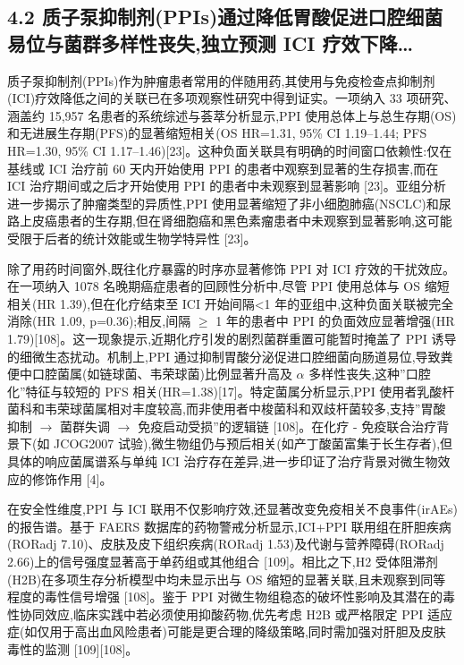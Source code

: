 \subsection{4.2 质子泵抑制剂(PPIs)通过降低胃酸促进口腔细菌易位与菌群多样性丧失,独立预测 ICI 疗效下降\ldots{}}\label{ux8d28ux5b50ux6cf5ux6291ux5236ux5242ppisux901aux8fc7ux964dux4f4eux80c3ux9178ux4fc3ux8fdbux53e3ux8154ux7ec6ux83ccux6613ux4f4dux4e0eux83ccux7fa4ux591aux6837ux6027ux4e27ux5931ux72ecux7acbux9884ux6d4b-ici-ux7597ux6548ux4e0bux964d}

质子泵抑制剂(PPIs)作为肿瘤患者常用的伴随用药,其使用与免疫检查点抑制剂(ICI)疗效降低之间的关联已在多项观察性研究中得到证实。一项纳入 33 项研究、涵盖约 15,957 名患者的系统综述与荟萃分析显示,PPI 使用总体上与总生存期(OS)和无进展生存期(PFS)的显著缩短相关(OS HR=1.31, 95\% CI 1.19--1.44; PFS HR=1.30, 95\% CI 1.17--1.46){[}23{]}。这种负面关联具有明确的时间窗口依赖性:仅在基线或 ICI 治疗前 60 天内开始使用 PPI 的患者中观察到显著的生存损害,而在 ICI 治疗期间或之后才开始使用 PPI 的患者中未观察到显著影响 {[}23{]}。亚组分析进一步揭示了肿瘤类型的异质性,PPI 使用显著缩短了非小细胞肺癌(NSCLC)和尿路上皮癌患者的生存期,但在肾细胞癌和黑色素瘤患者中未观察到显著影响,这可能受限于后者的统计效能或生物学特异性 {[}23{]}。

除了用药时间窗外,既往化疗暴露的时序亦显著修饰 PPI 对 ICI 疗效的干扰效应。在一项纳入 1078 名晚期癌症患者的回顾性分析中,尽管 PPI 使用总体与 OS 缩短相关(HR 1.39),但在化疗结束至 ICI 开始间隔\textless1 年的亚组中,这种负面关联被完全消除(HR 1.09, p=0.36);相反,间隔 \(\geq\) 1 年的患者中 PPI 的负面效应显著增强(HR 1.79){[}108{]}。这一现象提示,近期化疗引发的剧烈菌群重置可能暂时掩盖了 PPI 诱导的细微生态扰动。机制上,PPI 通过抑制胃酸分泌促进口腔细菌向肠道易位,导致粪便中口腔菌属(如链球菌、韦荣球菌)比例显著升高及 \(\alpha\) 多样性丧失,这种''口腔化''特征与较短的 PFS 相关(HR=1.38){[}17{]}。特定菌属分析显示,PPI 使用者乳酸杆菌科和韦荣球菌属相对丰度较高,而非使用者中梭菌科和双歧杆菌较多,支持''胃酸抑制 \(\rightarrow\) 菌群失调 \(\rightarrow\) 免疫启动受损''的逻辑链 {[}108{]}。在化疗 - 免疫联合治疗背景下(如 JCOG2007 试验),微生物组仍与预后相关(如产丁酸菌富集于长生存者),但具体的响应菌属谱系与单纯 ICI 治疗存在差异,进一步印证了治疗背景对微生物效应的修饰作用 {[}4{]}。

在安全性维度,PPI 与 ICI 联用不仅影响疗效,还显著改变免疫相关不良事件(irAEs)的报告谱。基于 FAERS 数据库的药物警戒分析显示,ICI+PPI 联用组在肝胆疾病(RORadj 7.10)、皮肤及皮下组织疾病(RORadj 1.53)及代谢与营养障碍(RORadj 2.66)上的信号强度显著高于单药组或其他组合 {[}109{]}。相比之下,H2 受体阻滞剂(H2B)在多项生存分析模型中均未显示出与 OS 缩短的显著关联,且未观察到同等程度的毒性信号增强 {[}108{]}。鉴于 PPI 对微生物组稳态的破坏性影响及其潜在的毒性协同效应,临床实践中若必须使用抑酸药物,优先考虑 H2B 或严格限定 PPI 适应症(如仅用于高出血风险患者)可能是更合理的降级策略,同时需加强对肝胆及皮肤毒性的监测 {[}109{]}{[}108{]}。

